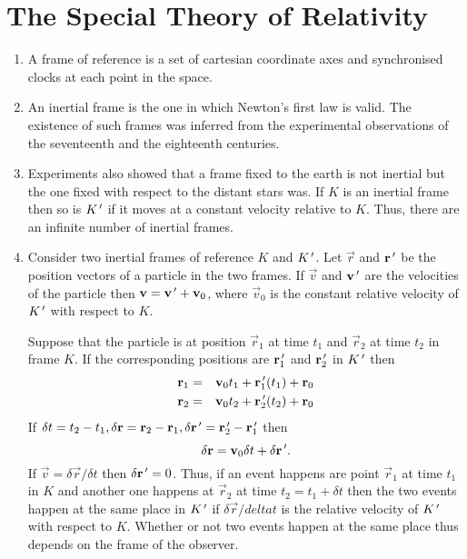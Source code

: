 \chapter{The Special Theory of Relativity}\label{c1}
\begin{enumerate}
\item A frame of reference is a set of cartesian coordinate axes and 
synchronised clocks at each point in the space.

\item An inertial frame is the one in which Newton's first law is valid. The 
existence of such frames was inferred from the experimental observations of the
seventeenth and the eighteenth centuries.

\item Experiments also showed that a frame fixed to the earth is not inertial
but the one fixed with respect to the distant stars was. If $K$ is an inertial
frame then so is $K^{\,\prime}$ if it moves at a constant velocity relative
to $K$. Thus, there are an infinite number of inertial frames.

\item Consider two inertial frames of reference $K$ and $K^{\,\prime}$. Let $\vec{r}$
and $\mathbf{r}^{\,\prime}$ be the position vectors of a particle in the two frames. If 
$\vec{v}$ and $\mathbf{v}^{\,\prime}$ are the velocities of the particle then $\mathbf{v} =
\mathbf{v}^{\,\prime} + \mathbf{v}_0$, where $\vec{v}_0$ is the constant relative velocity
of $K^{\,\prime}$ with respect to $K$.

Suppose that the particle is at position $\vec{r}_1$ at time $t_1$ and 
$\vec{r}_2$ at time $t_2$ in frame $K$. If the corresponding positions are
$\mathbf{r}_1^{\,\prime}$ and $\mathbf{r}_2^{\,\prime}$ in $K^{\,\prime}$ then
\begin{eqnarray*}
\mathbf{r}_1 &=& \mathbf{v}_0t_1 + \mathbf{r}_1^{\,\prime}(t_1) + \mathbf{r}_0 \\
\mathbf{r}_2 &=& \mathbf{v}_0t_2 + \mathbf{r}_2^{\,\prime}(t_2) + \mathbf{r}_0
\end{eqnarray*}
If $\delta t = t_2 - t_1, \delta\mathbf{r} = \mathbf{r}_2 - \mathbf{r}_1, 
\delta\mathbf{r}^{\,\prime} = \mathbf{r}_2^{\,\prime} - \mathbf{r}_1^{\,\prime}$ then
\[
\delta\mathbf{r} = \mathbf{v}_0\delta t + \delta\mathbf{r}^{\,\prime}.
\]
If $\vec{v} = \delta\vec{r}/\delta t$ then $\delta\mathbf{r}^{\,\prime} = 0$. Thus, if
an event happens are point $\vec{r}_1$ at time $t_1$ in $K$ and another one
happens at $\vec{r}_2$ at time $t_2 = t_1 + \delta t$ then the two events 
happen at the same place in $K^{\,\prime}$ if $\delta\vec{r}/delta t$ is the relative
velocity of $K^{\,\prime}$ with respect to $K$. Whether or not two events happen at
the same place thus depends on the frame of the observer.


\end{enumerate}
